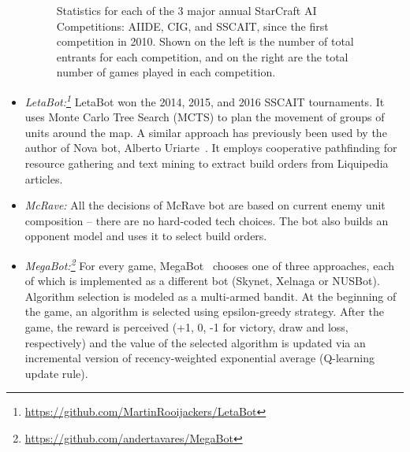 \begin{itemize}
\begin{figure}[t]
\begin{center}
  \caption{Statistics for each of the 3 major annual StarCraft AI Competitions: AIIDE, CIG, and SSCAIT, since the first competition in 2010. Shown on the left is the number of total entrants for each competition, and on the right are the total number of games played in each competition.  }
  \label{fig:comps}
  \end{center}
  \vspace{-0.5cm}
\end{figure}
  \item {\em LetaBot:\footnote{\url{https://github.com/MartinRooijackers/LetaBot}}} LetaBot won the 2014, 2015, and 2016 SSCAIT tournaments. It uses Monte Carlo Tree Search (MCTS) to plan the movement of groups of units around the map. A similar approach has previously been used by the author of Nova bot, Alberto Uriarte~\cite{uriarte2014high}. It employs cooperative pathfinding for resource gathering and text mining to extract build orders from Liquipedia articles.

  \item {\em McRave:} All the decisions of McRave bot are based on current enemy unit composition -- there are no hard-coded tech choices. The bot also builds an opponent model and uses it to select build orders. 

  \item {\em MegaBot:\footnote{\url{https://github.com/andertavares/MegaBot}}} For every game, MegaBot~\cite{tavares2016rock} chooses one of three approaches, each of which is implemented as a different bot (Skynet, Xelnaga or NUSBot). Algorithm selection is modeled as a multi-armed bandit. At the beginning of the game, an algorithm is selected using epsilon-greedy strategy. After the game, the reward is perceived (+1, 0, -1 for victory, draw and loss, respectively) and the value of the selected algorithm is updated via an incremental version of recency-weighted exponential average (Q-learning update rule).
  
  

\end{itemize}
